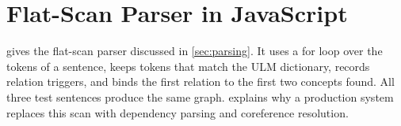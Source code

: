 \documentclass[twocolumn]{ulpaper}
\begin{document}


\appendix
\onecolumn
\section{Flat-Scan Parser in JavaScript}
\label{app:parser}

 gives the flat-scan parser discussed in \cref{sec:parsing}. It uses a for loop over the tokens of a sentence, keeps tokens that match the ULM dictionary, records relation triggers, and binds the first relation to the first two concepts found. All three test sentences produce the same graph.  explains why a production system replaces this scan with dependency parsing and coreference resolution.
\end{document}
